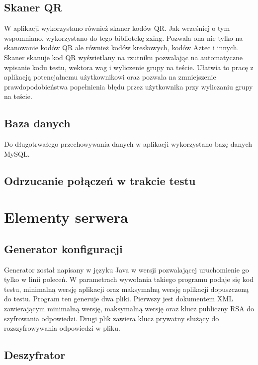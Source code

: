 \documentclass{report}
\begin{document}
		\section{Skaner QR}
		
		W aplikacji wykorzystano również skaner kodów QR. Jak wcześniej o tym wspomniano, wykorzystano do tego bibliotekę zxing. Pozwala ona nie tylko na skanowanie kodów QR ale również kodów kreskowych, kodów Aztec i innych. Skaner skanuje kod QR wyświetlany na rzutniku pozwalając na automatyczne wpisanie kodu testu, wektora wag i wyliczenie grupy na teście. Ułatwia to pracę z aplikacją potencjalnemu użytkownikowi oraz pozwala na zmniejszenie prawdopodobieństwa popełnienia błędu przez użytkownika przy wyliczaniu grupy na teście.
		
		\section{Baza danych}
		
		Do długotrwałego przechowywania danych w aplikacji wykorzystano bazę danych MySQL.
		
		\section{Odrzucanie połączeń w trakcie testu}
		
	\chapter{Elementy serwera}
		
		\section{Generator konfiguracji}
		
		Generator został napisany w języku Java w wersji pozwalającej uruchomienie go tylko w linii poleceń. W parametrach wywołania takiego programu podaje się kod testu, minimalną wersję aplikacji oraz maksymalną wersję aplikacji dopuszczoną do testu. Program ten generuje dwa pliki. Pierwszy jest dokumentem XML zawierającym minimalną wersję, maksymalną wersję oraz klucz publiczny RSA do szyfrowania odpowiedzi. Drugi plik zawiera klucz prywatny służący do rozszyfrowywania odpowiedzi w pliku.
		
		\section{Deszyfrator}
		
\end{document}
